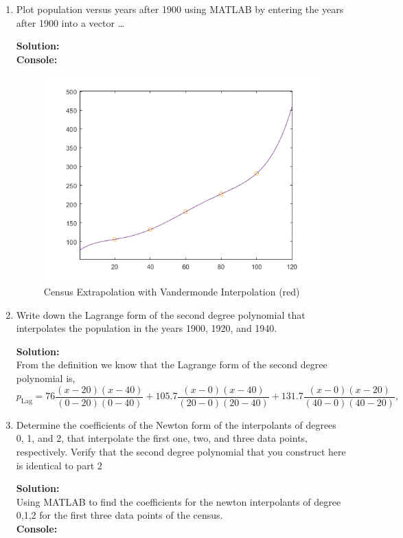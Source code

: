 \documentclass[12pt]{article}
\makeatletter
\theoremstyle{homework}
\newenvironment{exercise}[1]
{\def\@currentlabel{#1}\exercisecore}
{\endexercisecore}
\newcommand{\localhead}[1]{\par\smallskip\noindent\textbf{#1}\nobreak\\}%
\newcommand\solution{\localhead{Solution:}}
\makeatother
\begin{document}
\begin{exercise}{Exercise 8.1}
  \begin{enumerate}
    \item Plot population versus years  after 1900 using MATLAB by entering the years after 1900 into a vector \dots 
    \solution 
    \textbf{Console:}
  \begin{center}
  
  \end{center}
  
  \begin{figure}[H]
    \caption{Census Extrapolation with Vandermonde Interpolation (red)}
    \includegraphics[width = .80\textwidth]{Census.png}  
    \centering
  \end{figure}
  \vspace{.25in}


  \item  Write down the Lagrange form of the second­
  degree polynomial that interpolates the population in the years 1900, 1920, and 1940.\\

  \solution From the definition we know that the Lagrange form of the second­ degree polynomial is,
  \begin{equation*}
    p_{\mathrm{Lag}} =  76 \dfrac{(x - 20)(x - 40)}{(0 - 20)(0 - 40)} + 105.7 \dfrac{(x - 0)(x - 40)}{(20 - 0)(20 - 40)} + 131.7\dfrac{(x - 0)(x - 20)}{(40 - 0)(40 - 20)},
  \end{equation*} 
  \vspace{.25in}
  



\item Determine the coefficients of the Newton form of the interpolants of degrees 0, 1, and 2, that
 interpolate the first one, two, and three data points, respectively. 
Verify that the second­ degree polynomial that you construct here is identical to part 2\\
\solution Using MATLAB to find the coefficients for the newton interpolants of degree 0,1,2 for the first three data points of the census.\\ 
\textbf{Console:}
\begin{center}

\end{center}
\end{enumerate}
\end{exercise}
\end{document}
